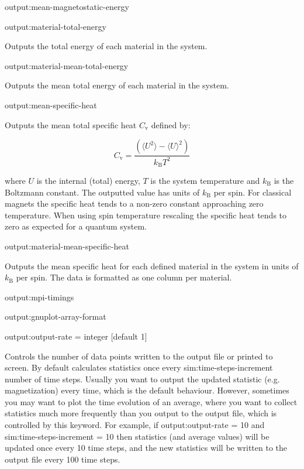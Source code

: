 {\zicf output:mean-magnetostatic-energy}

{\zicf output:material-total-energy} Outputs the total energy of each material in the system.

{\zicf output:material-mean-total-energy} Outputs the mean total energy of each material in the system.

{\zicf output:mean-specific-heat} Outputs the mean total specific heat $C_{\mathrm{v}}$ defined by:

\begin{equation*}
C_{\mathrm{v}} = \frac{\left(\langle U^2 \rangle - \langle U \rangle^2 \right)}{k_{\mathrm{B}} T^2}
\end{equation*}

\noindent where $U$ is the internal (total) energy, $T$ is the system temperature and $k_{\mathrm{B}}$ is the Boltzmann constant. The outputted value has units of $k_{\mathrm{B}}$ per spin. For classical magnets the specific heat tends to a non-zero constant approaching zero temperature. When using spin temperature rescaling the specific heat tends to zero as expected for a quantum system.

{\zicf output:material-mean-specific-heat} Outputs the mean specific heat for each defined material in the system in units of $k_{\mathrm{B}}$ per spin. The data is formatted as one column per material.

{\zicf output:mpi-timings}

{\zicf output:gnuplot-array-format}

{\zicf output:output-rate = integer [default 1]} Controls the number of data points written to the output file or printed to screen. By default \vampire calculates statistics once every sim:time-steps-increment number of time steps. Usually you want to output the updated statistic (e.g. magnetization) every time, which is the default behaviour. However, sometimes you may want to plot the time evolution of an average, where you want to collect statistics much more frequently than you output to the output file, which is controlled by this keyword. For example, if output:output-rate = 10 and sim:time-steps-increment = 10 then statistics (and average values) will be updated once every 10 time steps, and the new statistics will be written to the output file every 100 time steps.

